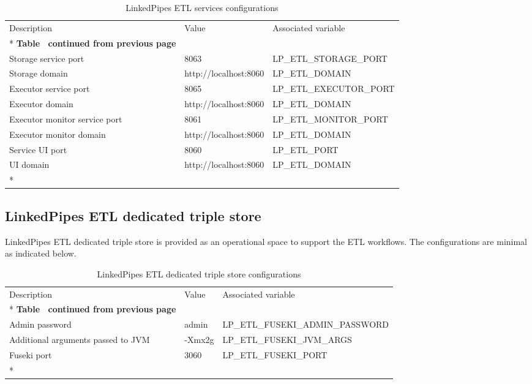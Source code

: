	\begin{longtable}[c]{@{}p{5cm}p{4cm}l@{}}
		\toprule
		Description & Value & Associated variable \\* \midrule
		\endfirsthead
		\multicolumn{3}{c}%
		{{\bfseries Table \thetable\ continued from previous page}} \\
		\endhead
		\bottomrule
		\endfoot
		\endlastfoot
		Storage service port & 8063 & LP\_ETL\_STORAGE\_PORT \\
		Storage domain & http://localhost:8060 & LP\_ETL\_DOMAIN \\
		Executor service port & 8065 & LP\_ETL\_EXECUTOR\_PORT \\
		Executor domain & http://localhost:8060 & LP\_ETL\_DOMAIN \\
		Executor monitor service port & 8061 & LP\_ETL\_MONITOR\_PORT \\
		Executor monitor domain & http://localhost:8060 & LP\_ETL\_DOMAIN \\
		Service UI port & 8060 & LP\_ETL\_PORT \\
		UI domain & http://localhost:8060 & LP\_ETL\_DOMAIN \\* \bottomrule
		\caption{LinkedPipes ETL services configurations}
		\label{tab:my-table5}\\
	\end{longtable}
	
	\subsection{LinkedPipes ETL dedicated triple store}
	
	LinkedPipes ETL dedicated triple store is provided as an operational space to support the ETL workflows. The configurations are minimal as indicated below. 
	
	\begin{longtable}[c]{@{}p{4cm}p{2cm}l@{}}
		\toprule
		Description & Value & Associated variable \\* \midrule
		\endfirsthead
		\multicolumn{3}{c}%
		{{\bfseries Table \thetable\ continued from previous page}} \\
		\endhead
		\bottomrule
		\endfoot
		\endlastfoot
		Admin password & admin & LP\_ETL\_FUSEKI\_ADMIN\_PASSWORD \\
		Additional arguments passed to JVM & -Xmx2g & LP\_ETL\_FUSEKI\_JVM\_ARGS \\
		Fuseki port & 3060 & LP\_ETL\_FUSEKI\_PORT \\* \bottomrule
		\caption{LinkedPipes ETL dedicated triple store configurations}
		\label{tab:my-table6}\\
	\end{longtable}
	
